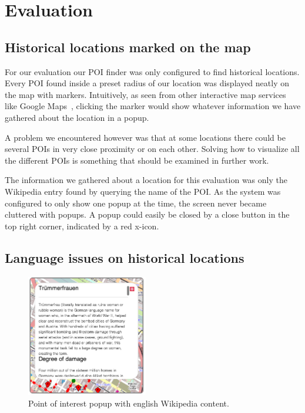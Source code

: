 \documentclass[journal]{IEEEtran}
\begin{document}
\section{Evaluation}

\subsection{Historical locations marked on the map}
For our evaluation our POI finder was only configured to find historical locations. Every POI found inside a preset radius of our location was displayed neatly on the map with markers. Intuitively, as seen from other interactive map services like Google Maps~\cite{google-maps}, clicking the marker would show whatever information we have gathered about the location in a popup. 

A problem we encountered however was that at some locations there could be several POIs in very close proximity or on each other. Solving how to visualize all the different POIs is something that should be examined in further work. 

The information we gathered about a location for this evaluation was only the Wikipedia entry found by querying the name of the POI. As the system was configured to only show one popup at the time, the screen never became cluttered with popups. A popup could easily be closed by a close button in the top right corner, indicated by a red x-icon.

\subsection{Language issues on historical locations}

        \begin{figure}[htb]
         \centering
         \includegraphics[width=200px]{popup_with_content}
         \caption{Point of interest popup with english Wikipedia content.}
         \label{popup_with_content}
        \end{figure}
\end{document}
